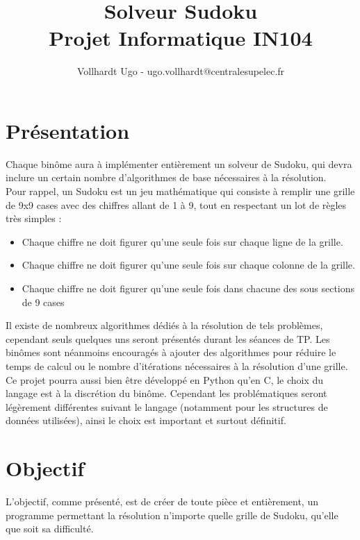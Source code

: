 \documentclass[a4paper,12pt]{article}
\title{\textbf{Solveur Sudoku}\\Projet Informatique IN104}
\date{}
\author{Vollhardt Ugo - ugo.vollhardt@centralesupelec.fr}
\begin{document}
	\maketitle
	\section{Présentation}
	
	Chaque binôme aura à implémenter entièrement un solveur de Sudoku, qui devra inclure un certain nombre d'algorithmes de base nécessaires à la résolution. \\
	
	Pour rappel, un Sudoku est un jeu mathématique qui consiste à remplir une grille de 9x9 cases avec des chiffres allant de 1 à 9, tout en respectant un lot de règles très simples : 
	\begin{itemize}
		\item Chaque chiffre ne doit figurer qu'une seule fois sur chaque ligne de la grille.
		\item Chaque chiffre ne doit figurer qu'une seule fois sur chaque colonne de la grille.
		\item Chaque chiffre ne doit figurer qu'une seule fois dans chacune des sous sections de 9 cases
	\end{itemize}

	Il existe de nombreux algorithmes dédiés à la résolution de tels problèmes, cependant seuls quelques uns seront présentés durant les séances de TP. Les binômes sont néanmoins encouragés à ajouter des algorithmes pour réduire le temps de calcul ou le nombre d'itérations nécessaires à la résolution d'une grille. \\
	
	Ce projet pourra aussi bien être développé en Python qu'en C, le choix du langage est à la discrétion du binôme. Cependant les problématiques seront légèrement différentes suivant le langage (notamment pour les structures de données utilisées), ainsi le choix est important et surtout définitif. 
	
	\section{Objectif}
	L'objectif, comme présenté, est de créer de toute pièce et entièrement, un programme permettant la résolution n'importe quelle grille de Sudoku, qu'elle que soit sa difficulté. \\
	
\end{document}
